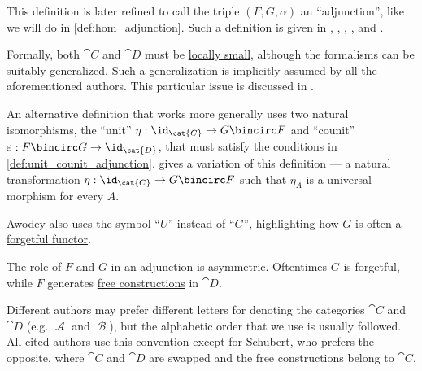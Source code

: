 \begin{remark}
\begin{thmenum}
    This definition is later refined to call the triple \( (F, G, \alpha) \) an \enquote{adjunction}, like we will do in \cref{def:hom_adjunction}. Such a definition is given in
    \cite[80]{MacLane1998CategoryTheory},
    \cite[def. 16.4.1]{Schubert1972Categories},
    \cite[def. 4.1.1]{Perrone2024StartingCategoryTheory},
    \cite[def. 2.1.1]{Leinster2014BasicCategoryTheory},
    \cite[116]{Riehl2016CategoryTheory} and
    \cite[178]{ЦаленкоШульгейфер1974ОсновыТеорииКатегорий}.

    Formally, both \( \cat{C} \) and \( \cat{D} \) must be \hyperref[def:small_category]{locally small}, although the formalisms can be suitably generalized. Such a generalization is implicitly assumed by all the aforementioned authors. This particular issue is discussed in \cite{MathSE:definition_of_adjoint_functor_and_locally_small_categories}.

     An alternative definition that works more generally uses two natural isomorphisms, the \enquote{unit} \( \eta: \id_{\cat{C}} \to G \bincirc F \) and \enquote{counit} \( \varepsilon: F \bincirc G \to \id_{\cat{D}} \), that must satisfy the conditions in \cref{def:unit_counit_adjunction}. \Textcite[def. 9.1]{Awodey2010CategoryTheory} gives a variation of this definition --- a natural transformation \( \eta: \id_{\cat{C}} \to G \bincirc F \) such that \( \eta_A \) is a universal morphism for every \( A \).

    Awodey also uses the symbol \enquote{\( U \)} instead of \enquote{\( G \)}, highlighting how \( G \) is often a \hyperref[con:forgetful_functor]{forgetful functor}.

     The role of \( F \) and \( G \) in an adjunction is asymmetric. Oftentimes \( G \) is forgetful, while \( F \) generates \hyperref[con:free_construction]{free constructions} in \( \cat{D} \).

    Different authors may prefer different letters for denoting the categories \( \cat{C} \) and \( \cat{D} \) (e.g. \( \mscrA \) and \( \mscrB \)), but the alphabetic order that we use is usually followed. All cited authors use this convention except for Schubert, who prefers the opposite, where \( \cat{C} \) and \( \cat{D} \) are swapped and the free constructions belong to \( \cat{C} \).
  \end{thmenum}
\end{remark}


